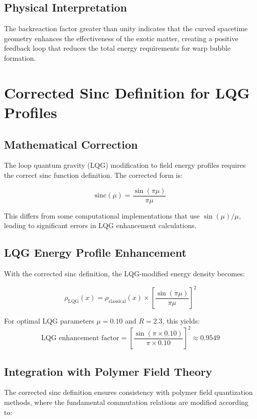 \documentclass[11pt]{article}
\begin{document}
\subsection{Physical Interpretation}
The backreaction factor greater than unity indicates that the curved spacetime geometry enhances the effectiveness of the exotic matter, creating a positive feedback loop that reduces the total energy requirements for warp bubble formation.

\section{Corrected Sinc Definition for LQG Profiles}

\subsection{Mathematical Correction}
The loop quantum gravity (LQG) modification to field energy profiles requires the correct sinc function definition. The corrected form is:

\begin{equation}
\text{sinc}(\mu) = \frac{\sin(\pi\mu)}{\pi\mu}
\end{equation}

This differs from some computational implementations that use $\sin(\mu)/\mu$, leading to significant errors in LQG enhancement calculations.

\subsection{LQG Energy Profile Enhancement}
With the corrected sinc definition, the LQG-modified energy density becomes:

\begin{equation}
\rho_{\text{LQG}}(x) = \rho_{\text{classical}}(x) \times \left[\frac{\sin(\pi\mu)}{\pi\mu}\right]^2
\end{equation}

For optimal LQG parameters $\mu = 0.10$ and $R = 2.3$, this yields:
\begin{equation}
\text{LQG enhancement factor} = \left[\frac{\sin(\pi \times 0.10)}{\pi \times 0.10}\right]^2 \approx 0.9549
\end{equation}

\subsection{Integration with Polymer Field Theory}
The corrected sinc definition ensures consistency with polymer field quantization methods, where the fundamental commutation relations are modified according to:
\end{document}
